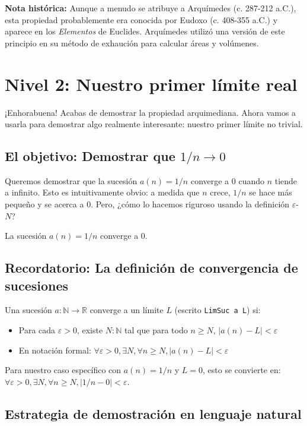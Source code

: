 \textbf{Nota histórica:} Aunque a menudo se atribuye a Arquímedes (c. 287-212 a.C.), esta propiedad probablemente era conocida por Eudoxo (c. 408-355 a.C.) y aparece en los \textit{Elementos} de Euclides. Arquímedes utilizó una versión de este principio en su método de exhaución para calcular áreas y volúmenes.

\section{Nivel 2: Nuestro primer límite real}

¡Enhorabuena! Acabas de demostrar la propiedad arquimediana. Ahora vamos a usarla para demostrar algo realmente interesante: nuestro primer límite no trivial.

\subsection{El objetivo: Demostrar que $1/n \to 0$}

Queremos demostrar que la sucesión $a(n) = 1/n$ converge a 0 cuando $n$ tiende a infinito. Esto es intuitivamente obvio: a medida que $n$ crece, $1/n$ se hace más pequeño y se acerca a 0. Pero, ¿cómo lo hacemos riguroso usando la definición $\varepsilon$-$N$?

\begin{theorem}
  La sucesión $a(n) = 1/n$ converge a 0.
\end{theorem}

\subsection{Recordatorio: La definición de convergencia de sucesiones}

Una sucesión $a : \mathbb{N} \to \mathbb{R}$ converge a un límite $L$ (escrito \texttt{LimSuc a L}) si:
\begin{itemize}
    \item Para cada $\varepsilon > 0$, existe $N : \mathbb{N}$ tal que para todo $n \ge N$, $|a(n) - L| < \varepsilon$
    \item En notación formal: $\forall \varepsilon > 0, \exists N, \forall n \ge N, |a(n) - L| < \varepsilon$
\end{itemize}
Para nuestro caso específico con $a(n) = 1/n$ y $L = 0$, esto se convierte en:
$\forall \varepsilon > 0, \exists N, \forall n \ge N, |1/n - 0| < \varepsilon$.

\subsection{Estrategia de demostración en lenguaje natural}

